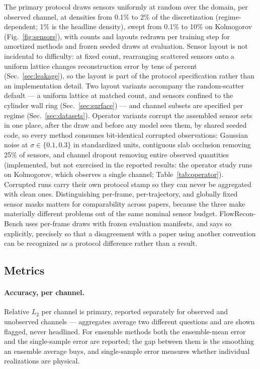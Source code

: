 \documentclass[aip,pof,reprint,amsmath,amssymb,superscriptaddress]{revtex4-1}
\newcommand{\benchname}{FlowRecon-Bench}
\begin{document}
The primary protocol draws sensors uniformly at random over the domain,
per observed channel, at densities from 0.1\% to 2\% of the discretization
(regime-dependent; 1\% is the headline density), swept from 0.1\% to 10\% on
Kolmogorov (Fig.~\ref{fig:sensors}), with counts and layouts
redrawn per training step for amortized methods and frozen seeded draws at
evaluation. Sensor layout is not incidental to difficulty: at fixed count,
rearranging scattered sensors onto a uniform lattice changes reconstruction
error by tens of percent (Sec.~\ref{sec:leakage}), so the layout is part of
the protocol specification rather than an implementation detail. Two layout
variants accompany the random-scatter default --- a uniform lattice at matched
count, and sensors confined to the cylinder wall ring (Sec.~\ref{sec:surface})
--- and channel subsets are specified per regime (Sec.~\ref{sec:datasets}).
Operator variants corrupt the assembled sensor sets in one place, after the
draw and before any model sees them, by shared seeded code, so every method
consumes bit-identical corrupted observations: Gaussian noise at
$\sigma\in\{0.1,0.3\}$ in standardized units, contiguous
slab occlusion removing 25\% of sensors, and channel dropout removing entire
observed quantities (implemented, but not exercised in the reported results:
the operator study runs on Kolmogorov, which observes a single channel;
Table~\ref{tab:operator}). Corrupted runs carry their own protocol stamp so they can
never be aggregated with clean ones. Distinguishing per-frame, per-trajectory, and globally
fixed sensor masks matters for comparability across papers, because the three
make materially different problems out of the same nominal sensor budget.
\benchname{} uses per-frame draws with frozen evaluation manifests, and says
so explicitly, precisely so that a disagreement with a paper using another
convention can be recognized as a protocol difference rather than a result.

\subsection{Metrics}\label{sec:metrics}

\paragraph{Accuracy, per channel.} Relative $L_2$ per channel is primary,
reported separately for observed and unobserved channels --- aggregates
average two different questions and are shown flagged, never headlined. For
ensemble methods both the ensemble-mean error and the single-sample error are
reported; the gap between them is the smoothing an ensemble average buys, and
single-sample error measures whether individual realizations are physical.
\end{document}
